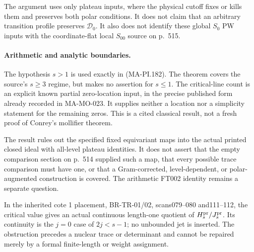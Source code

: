 The argument uses only plateau inputs, where the physical
cutoff fixes or kills them and preserves both polar conditions.
It does not claim that an arbitrary transition profile
preserves \(\mathcal D_0\). It also does not identify these
global \(S_0\) PW inputs with the coordinate-flat local
\(S_{00}\) source on p.~515.

\paragraph{Arithmetic and analytic boundaries.}
The hypothesis \(s>1\) is used exactly in (MA-PI.182).
The theorem covers the source's \(s\ge3\) regime, but makes
no assertion for \(s\le1\). The critical-line count is an
explicit known partial zero-location input, in the precise
published form already recorded in MA-MO-023. It supplies
neither a location nor a simplicity statement for the
remaining zeros. This is a cited classical result, not
a fresh proof of Conrey's mollifier theorem.

The result rules out the specified fixed equivariant maps
into the actual printed closed ideal with all-level plateau
identities. It does not assert that the empty comparison
section on p.~514 supplied such a map, that every possible
trace comparison must have one, or that a Gram-corrected,
level-dependent, or polar-augmented construction is covered.
The arithmetic FT002 identity remains a separate question.

In the inherited cote 1 placement, BR-TR-01/02,
scans079--080 and111--112, the critical value gives an actual
continuous length-one quotient of
\(H_s^{\rm pr}/J_s^{\rm pr}\).
Its continuity is the \(j=0\) case of \(2j<s-1\);
no unbounded jet is inserted. The obstruction precedes a
nuclear trace or determinant and cannot be repaired merely
by a formal finite-length or weight assignment.
